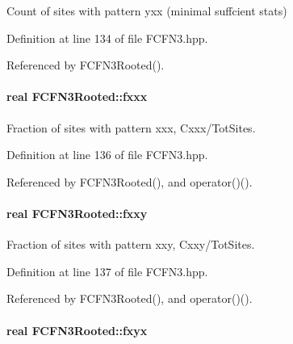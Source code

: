 \-Count of sites with pattern yxx (minimal suffcient stats) 



\-Definition at line 134 of file \-F\-C\-F\-N3.\-hpp.



\-Referenced by \-F\-C\-F\-N3\-Rooted().

\hypertarget{classFCFN3Rooted_a99fc875bb556dc2f20eee8cfdcb55e41}{
\paragraph[{fxxx}]{\setlength{\rightskip}{0pt plus 5cm}real {\bf \-F\-C\-F\-N3\-Rooted\-::fxxx}}}\label{classFCFN3Rooted_a99fc875bb556dc2f20eee8cfdcb55e41}


\-Fraction of sites with pattern xxx, \-Cxxx/\-Tot\-Sites. 



\-Definition at line 136 of file \-F\-C\-F\-N3.\-hpp.



\-Referenced by \-F\-C\-F\-N3\-Rooted(), and operator()().

\hypertarget{classFCFN3Rooted_a432d5b5019c490dbb321f9756d3ac37f}{
\paragraph[{fxxy}]{\setlength{\rightskip}{0pt plus 5cm}real {\bf \-F\-C\-F\-N3\-Rooted\-::fxxy}}}\label{classFCFN3Rooted_a432d5b5019c490dbb321f9756d3ac37f}


\-Fraction of sites with pattern xxy, \-Cxxy/\-Tot\-Sites. 



\-Definition at line 137 of file \-F\-C\-F\-N3.\-hpp.



\-Referenced by \-F\-C\-F\-N3\-Rooted(), and operator()().

\hypertarget{classFCFN3Rooted_a3a97b7a6f1ba450e0bb32968091549b9}{
\paragraph[{fxyx}]{\setlength{\rightskip}{0pt plus 5cm}real {\bf \-F\-C\-F\-N3\-Rooted\-::fxyx}}}\label{classFCFN3Rooted_a3a97b7a6f1ba450e0bb32968091549b9}


